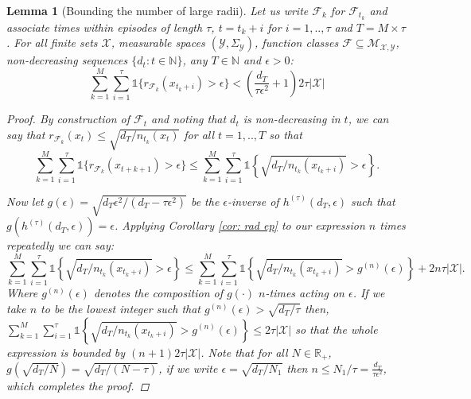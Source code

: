\documentclass{article}
\newtheorem{lemma}{Lemma}
\newcommand{\Real}{\mathds{R}}
\newcommand{\Nat}{\mathbb{N}}
\newcommand{\Ind}{\mathds{1}}
\newcommand{\Xc}{\mathcal{X}}
\newcommand{\Yc}{\mathcal{Y}}
\newcommand{\Fc}{\mathcal{F}}
\newcommand{\Mc}{\mathcal{M}}
\begin{document}
\begin{lemma}[Bounding the number of large radii] 
\label{lem: large rad} \hspace{0.000000001mm} \newline
Let us write $\Fc_k$ for $\Fc_{t_k}$ and associate times within episodes of length $\tau$, $t = t_k+i$ for $i=1,..,\tau$ and $T = M \times \tau$.
For all finite sets $\Xc$, measurable spaces $(\Yc,\Sigma_{\Yc})$, function classes $\Fc \subseteq \Mc_{\Xc,\Yc}$, non-decreasing sequences 
$\{d_t : t \in \Nat \}$, any $T \in \Nat$ and $\epsilon >0$:
$$ \sum_{k=1}^M \sum_{i=1}^\tau \Ind\{r_{\Fc_k}(x_{t_k+i}) > \epsilon \} < \left( \frac{d_T}{\tau \epsilon^2} +1 \right) 2\tau | \Xc | $$

\begin{proof}
By construction of $\Fc_t$ and noting that $d_t$ is non-decreasing in $t$, we can say that $r_{\Fc_k}(x_t) \le \sqrt{d_T / n_{t_k}(x_t)} $ for all $ t = 1,..,T$ so that
$$ \sum_{k=1}^M \sum_{i=1}^\tau \Ind\{r_{\Fc_k}(x_{t+k+1}) > \epsilon \}
	 \le \sum_{k=1}^M \sum_{i=1}^\tau  \Ind \left\{ \sqrt{ d_T / n_{t_k}(x_{t_k+i}) } > \epsilon \right\}  .$$

Now let $g(\epsilon) = \sqrt{d_T \epsilon^2 / (d_T - \tau \epsilon^2)}$ be the $\epsilon$-inverse of $h^{(\tau)}(d_T,\epsilon)$ such that $g( h^{(\tau)}(d_T,\epsilon)) = \epsilon$.
Applying Corollary \ref{cor: rad ep} to our expression $n$ times repeatedly we can say:
$$\sum_{k=1}^M \sum_{i=1}^\tau  \Ind \left\{ \sqrt{ d_T / n_{t_k}(x_{t_k+i}) } > \epsilon \right\} \le 
	\sum_{k=1}^M \sum_{i=1}^\tau  \Ind \left\{ \sqrt{ d_T / n_{t_k}(x_{t_k+i}) } > g^{(n)}(\epsilon) \right\} + 2n \tau |\Xc|.$$
Where $g^{(n)}(\epsilon)$ denotes the composition of $g(\cdot)$ $n$-times acting on $\epsilon$.
If we take $n$ to be the lowest integer such that $g^{(n)}(\epsilon) > \sqrt{d_T / \tau}$ then, 
$\sum_{k=1}^M \sum_{i=1}^\tau  \Ind \left\{ \sqrt{ d_T / n_{t_k}(x_{t_k+i}) } > g^{(n)}(\epsilon) \right\} \le 2\tau |\Xc| $ so that the whole expression is bounded by $ \left( n + 1 \right) 2\tau | \Xc |$.
Note that for all $N \in \Real_+$, $g(\sqrt{d_T / N}) = \sqrt{d_T / (N-\tau)}$, if we write $\epsilon = \sqrt{d_T / N_1}$ then $n \le N_1 / \tau = \frac{d_T}{ \tau \epsilon^2}$, which completes the proof.

\end{proof}
\end{lemma}
\end{document}
